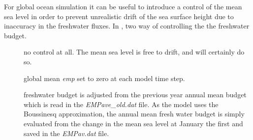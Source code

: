 \documentclass[../tex_main/NEMO_manual]{subfiles}
\begin{document}
For global ocean simulation it can be useful to introduce a control of the mean sea level in order to
prevent unrealistic drift of the sea surface height due to inaccuracy in the freshwater fluxes.
In \NEMO, two way of controlling the the freshwater budget. 
\begin{description}
\item[]
  no control at all.
  The mean sea level is free to drift, and will certainly do so.
\item[]
  global mean \textit{emp} set to zero at each model time step. 
\item[]
  freshwater budget is adjusted from the previous year annual mean budget which
  is read in the \textit{EMPave\_old.dat} file.
  As the model uses the Boussinesq approximation, the annual mean fresh water budget is simply evaluated from
  the change in the mean sea level at January the first and saved in the \textit{EMPav.dat} file. 
\end{description}



\end{document}

